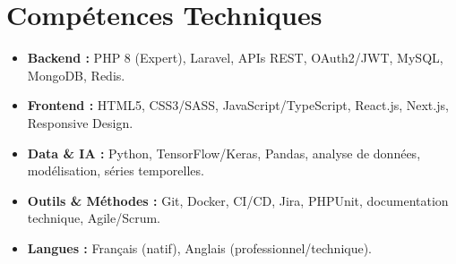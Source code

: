 \documentclass[a4paper,11pt]{article}
\begin{document}
\section{Compétences Techniques}
\begin{itemize}[leftmargin=*, nosep]
    \item \small{\textbf{Backend :} PHP 8 (Expert), Laravel, APIs REST, OAuth2/JWT, MySQL, MongoDB, Redis.}
    \item \small{\textbf{Frontend :} HTML5, CSS3/SASS, JavaScript/TypeScript, React.js, Next.js, Responsive Design.}
    \item \small{\textbf{Data \& IA :} Python, TensorFlow/Keras, Pandas, analyse de données, modélisation, séries temporelles.}
    \item \small{\textbf{Outils \& Méthodes :} Git, Docker, CI/CD, Jira, PHPUnit, documentation technique, Agile/Scrum.}
    \item \small{\textbf{Langues :} Français (natif), Anglais (professionnel/technique).}
\end{itemize}

\end{document}
